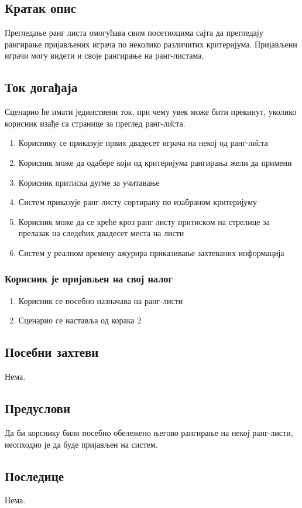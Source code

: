 \subsection{Кратак опис}
Прегледање ранг листа омогућава свим посетиоцима сајта да прегледају рангирање
пријављених играча по неколико различитих критеријума. Пријављени играчи могу видети и
своје рангирање на ранг-листама.

\subsection{Ток догађаја}
Сценарио ће имати јединствени ток, при чему увек може бити прекинут, уколико корисник
изађе са странице за преглед ранг-л\^{и}ста.

\begin{enumerate}
	\item Кориснику се приказује првих двадесет играча на некој од ранг-л\^{и}ста
	\item Корисник може да одабере који од критеријума рангирања жели да примени 
	\item Корисник притиска дугме за учитавање
	\item Систем приказује ранг-листу сортирану по изабраном критеријуму
	\item Корисник може да се креће кроз ранг листу притиском на стрелице за прелазак на
	      следећих двадесет места на листи
	\item Систем у реалном времену ажурира приказивање захтеваних информација
\end{enumerate}

\subsubsection{Корисник је пријављен на свој налог}
\begin{enumerate}[label=1.\arabic*]
	\item Корисник се посебно назначава на ранг-листи
	\item Сценарио се наставља од корака 2
\end{enumerate}

\subsection{Посебни захтеви}
Нема.

\subsection{Предуслови}
Да би корснику било посебно обележено његово рангирање на некој ранг-листи, неопходно је
да буде пријављен на систем. 

\subsection{Последице}
Нема.
